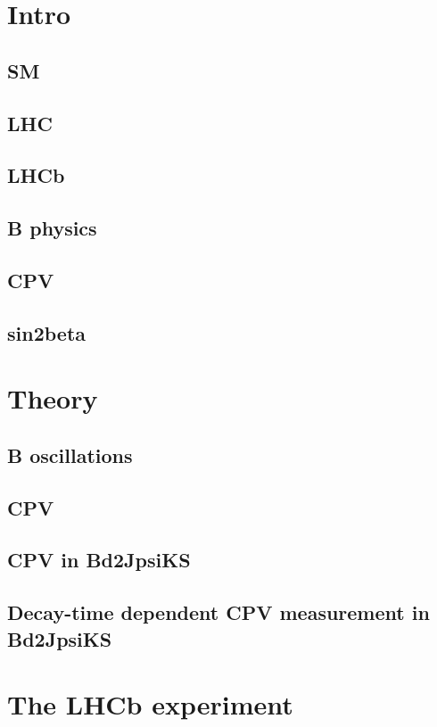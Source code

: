 
% 

\chapter{Intro}
\section{SM}
\section{LHC}
\section{LHCb}
\section{B physics}
\section{CPV}
\section{sin2beta}

\chapter{Theory}
\section{B oscillations}
\section{CPV}
\section{CPV in Bd2JpsiKS}
\section{Decay-time dependent CPV measurement in Bd2JpsiKS}

\chapter{The LHCb experiment}
